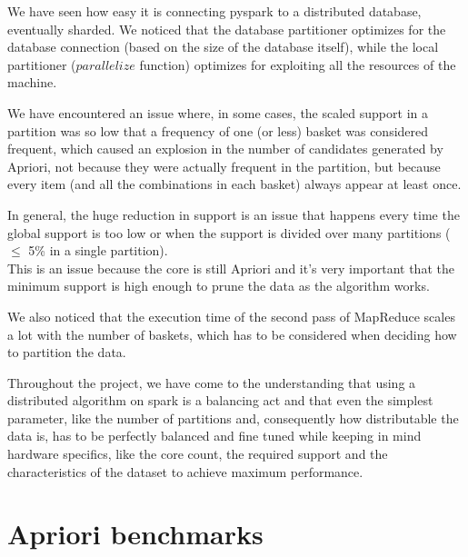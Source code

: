 \documentclass[a4paper]{article}
\begin{document}
	We have seen how easy it is connecting pyspark to a distributed database, eventually sharded.	
	We noticed that the database partitioner optimizes for the database connection (based on the size of the database itself), 
	while the local partitioner ($parallelize$ function) optimizes for exploiting all the resources of the machine.
	
	We have encountered an issue where, in some cases, the scaled support in a partition was so low that a frequency of one (or less) basket was considered frequent, 
	which caused an explosion in the number of candidates generated by Apriori, not because they were actually frequent in the partition, but 
	because every item (and all the combinations in each basket) always appear at least once. 

	In general, the huge reduction in support is an issue that happens every time the global support is too low or when the support is divided over many partitions ($\leq$ 5\% in a single partition).\\
	This is an issue because the core is still Apriori and it's very important that the minimum support is high enough to prune the data as the algorithm works.

	We also noticed that the execution time of the second pass of MapReduce scales a lot with the number of baskets, which has to be considered when deciding how to partition the data.

	Throughout the project, we have come to the understanding that using a distributed algorithm on spark is a balancing act and that even the simplest parameter, like the number of partitions and, consequently how distributable 
	the data is, has to be perfectly balanced and fine tuned while keeping in mind hardware specifics, like the core count, the required support and the characteristics of the dataset to achieve 
	maximum performance.
	

	\appendix 

	\section{Apriori benchmarks}
\end{document}
